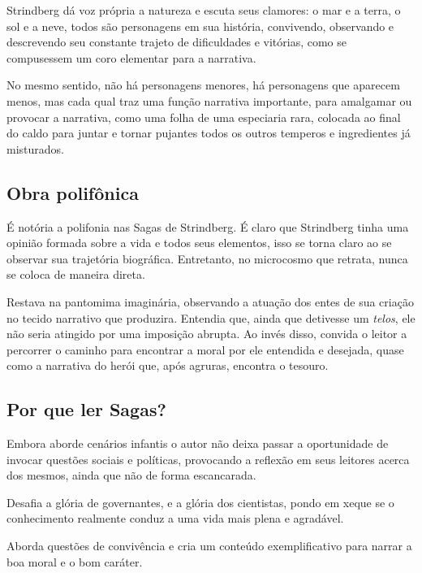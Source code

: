 \documentclass[12pt]{extarticle}
\begin{document}


Strindberg dá voz própria a natureza e escuta seus clamores: o mar e a
terra, o sol e a neve, todos são personagens em sua história,
convivendo, observando e descrevendo seu constante trajeto de
dificuldades e vitórias, como se compusessem um coro elementar para a
narrativa.

No mesmo sentido, não há personagens menores, há personagens que
aparecem menos, mas cada qual traz uma função narrativa importante, para
amalgamar ou provocar a narrativa, como uma folha de uma especiaria
rara, colocada ao final do caldo para juntar e tornar pujantes todos os
outros temperos e ingredientes já misturados.

\subsection{Obra polifônica}

É notória a polifonia nas Sagas de Strindberg. É claro que Strindberg
tinha uma opinião formada sobre a vida e todos seus elementos, isso se
torna claro ao se observar sua trajetória biográfica. Entretanto, no
microcosmo que retrata, nunca se coloca de maneira direta.

Restava na pantomima imaginária, observando a atuação dos entes de sua
criação no tecido narrativo que produzira. Entendia que, ainda que
detivesse um \emph{telos}, ele não seria atingido por uma imposição
abrupta. Ao invés disso, convida o leitor a percorrer o caminho para
encontrar a moral por ele entendida e desejada, quase como a narrativa
do herói que, após agruras, encontra o tesouro.

\subsection{Por que ler Sagas?}

Embora aborde cenários infantis o autor não deixa passar a oportunidade
de invocar questões sociais e políticas, provocando a reflexão em seus
leitores acerca dos mesmos, ainda que não de forma escancarada.

Desafia a glória de governantes, e a glória dos cientistas, pondo em
xeque se o conhecimento realmente conduz a uma vida mais plena e
agradável.

Aborda questões de convivência e cria um conteúdo exemplificativo para
narrar a boa moral e o bom caráter.
\end{document}
